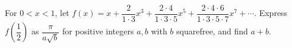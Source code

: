For $0<x<1$, let $f(x)=x+\dfrac{2}{1\cdot3}x^3+\dfrac{2\cdot4}{1\cdot3\cdot5}x^5+\dfrac{2\cdot4\cdot6}{1\cdot3\cdot5\cdot7}x^7+\cdots$. Express $f (\dfrac{1}{2})$ as $\dfrac{\pi}{a\sqrt b}$ for positive integers $a,b$ with $b$ squarefree, and find $a+b$.
